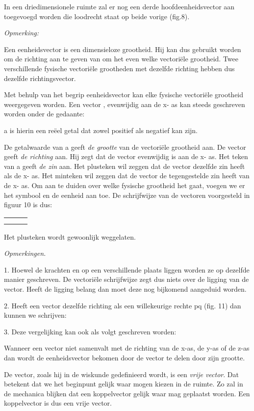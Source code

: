 \documentclass[]{article}
\begin{document}
In een driedimensionele ruimte zal er nog een derde hoofdeenheidsvector
aan toegevoegd worden die loodrecht staat op beide vorige (fig.8).

\emph{Opmerking:}

Een eenheidsvector is een dimensieloze grootheid. Hij kan dus gebruikt
worden om de richting aan te geven van om het even welke vectoriële
grootheid. Twee verschillende fysische vectoriële grootheden met
dezelfde richting hebben dus dezelfde richtingsvector.

Met behulp van het begrip eenheidsvector kan elke fysische vectoriële
grootheid weergegeven worden. Een vector , evenwijdig aan de x- as kan
steeds geschreven worden onder de gedaante:

a is hierin een reëel getal dat zowel positief als negatief kan zijn.

De getalwaarde van a geeft \emph{de grootte} van de vectoriële grootheid
aan. De vector geeft \emph{de richting} aan. Hij zegt dat de vector
evenwijdig is aan de x- as. Het teken van a geeft \emph{de zin} aan. Het
plusteken wil zeggen dat de vector dezelfde zin heeft als de x- as. Het
minteken wil zeggen dat de vector de tegengestelde zin heeft van de x-
as. Om aan te duiden over welke fysische grootheid het gaat, voegen we
er het symbool en de eenheid aan toe. De schrijfwijze van de vectoren
voorgesteld in figuur 10 is dus:

\begin{longtable}[c]{@{}lll@{}}
\toprule
& &\tabularnewline
& &\tabularnewline
\bottomrule
\end{longtable}

Het plusteken wordt gewoonlijk weggelaten.

\emph{Opmerkingen.}

1. Hoewel de krachten en op een verschillende plaats liggen worden ze op
dezelfde manier geschreven. De vectoriële schrijfwijze zegt dus niets
over de ligging van de vector. Heeft de ligging belang dan moet deze nog
bijkomend aangeduid worden.

2. Heeft een vector dezelfde richting als een willekeurige rechte pq
(fig. 11) dan kunnen we schrijven:

3. Deze vergelijking kan ook als volgt geschreven worden:

Wanneer een vector niet samenvalt met de richting van de x-as, de y-as
of de z-as dan wordt de eenheidsvector bekomen door de vector te delen
door zijn grootte.

De vector, zoals hij in de wiskunde gedefinieerd wordt, is een
\emph{vrije vector}. Dat betekent dat we het beginpunt gelijk waar mogen
kiezen in de ruimte. Zo zal in de mechanica blijken dat een koppelvector
gelijk waar mag geplaatst worden. Een koppelvector is dus een vrije
vector.
\end{document}
